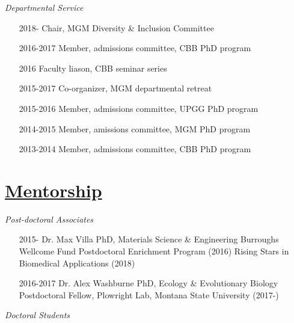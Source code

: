 \documentclass[overlapped,line,11pt]{res}
\begin{document}
\begin{resume}
\emph{Departmental Service}
\vspace{.15in}
\begin{itemize}[leftmargin=2cm, style=sameline, itemsep=0mm]
\item[2018-] Chair, MGM Diversity \& Inclusion Committee
\item[2016-2017] Member, admissions committee, CBB PhD program
\item[2016] Faculty liason, CBB seminar series
\item[2015-2017] Co-organizer, MGM departmental retreat
\item[2015-2016] Member, admissions committee, UPGG PhD program
\item[2014-2015] Member, amissions committee, MGM PhD program
\item[2013-2014] Member, admissions committee, CBB PhD program
\end{itemize}


\section{\underline{\sc Mentorship}}
\vspace{.1in}

\emph{Post-doctoral Associates}
\vspace{.1in}

\begin{itemize}[leftmargin=2cm, style=sameline, itemsep=0mm]

\item[2015-] Dr. Max Villa \newline 
  PhD, Materials Science \& Engineering \newline
  Burroughs Wellcome Fund Postdoctoral Enrichment Program (2016) \newline
  Rising Stars in Biomedical Applications (2018)
\item[2016-2017] Dr. Alex Washburne \newline 
  PhD, Ecology \& Evolutionary Biology \newline
  Postdoctoral Fellow, Plowright Lab, Montana State University (2017-)
  
\end{itemize}

\vspace{-.1in}
\emph{Doctoral Students}
\vspace{.1in}

\begin{itemize}[leftmargin=2cm, style=sameline, itemsep=0mm]


\end{itemize}
\end{resume}
\end{document}
